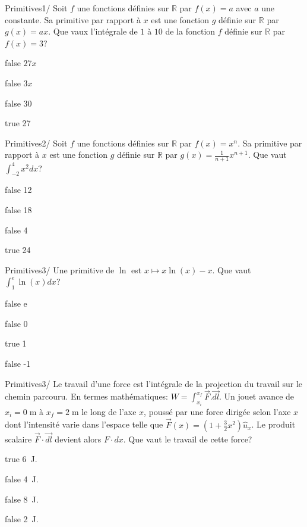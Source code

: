         	\begin{question}{60}{Primitives}{1}{/}
				Soit $f$ une fonctions définies sur $\mathbb{R}$ par $f(x)=a$ avec $a$ une constante. Sa primitive par rapport à $x$ est une fonction $g$ définie sur $\mathbb{R}$ par $g(x)=ax$. Que vaux l'intégrale de $1$ à $10$ de la fonction $f$ définie sur $\mathbb{R}$ par $f(x)=3$?
            \end{question}
            \begin{reponses}
            	\item[false] $27x$
            	\item[false] $3x$
                \item[false] 30
                \item[true] 27
            \end{reponses}
            \begin{question}{60}{Primitives}{2}{/}
                Soit $f$ une fonctions définies sur $\mathbb{R}$ par $f(x)=x^n$. Sa primitive par rapport à $x$ est une fonction $g$ définie sur $\mathbb{R}$ par $g(x)=\frac{1}{n+1}x^{n+1}$. Que vaut $\int_{-2}^4 x^2 dx$?
            \end{question}
            \begin{reponses}
                \item[false] 12
                \item[false] 18
                \item[false] 4
                \item[true] 24
            \end{reponses}
        	\begin{question}{60}{Primitives}{3}{/}
				Une primitive de $\ln$ est $x\mapsto x\ln(x)-x$. Que vaut $\int_{1}^e \ln(x)dx$?
            \end{question}
            \begin{reponses}
            	\item[false] e
            	\item[false] 0
                \item[true] 1
                \item[false] -1
            \end{reponses}
            \begin{question}{60}{Primitives}{3}{/}
                Le travail d'une force est l'intégrale de la projection du travail sur le chemin parcouru. En termes mathématiques: $W=\int_{x_i}^{x_f}\vec{F}.\vec{dl}$. Un jouet avance de $x_i=0\;\si{\meter}$ à $x_f=2\;\si{\meter}$ le long de l'axe $x$, poussé par une force dirigée selon l'axe $x$ dont l'intensité varie dans l'espace telle que $\vec{F}(x) = (1+\frac{3}{2}x^2)\hat{u}_x$. Le produit scalaire $\vec{F}\cdot\vec{dl}$ devient alors $F\cdot dx$.
                Que vaut le travail de cette force?
            \end{question}
            \begin{reponses}
                \item[true] \SI{6}{J}.
                \item[false] \SI{4}{J}.
                \item[false] \SI{8}{J}.
                \item[false] \SI{2}{J}.
            \end{reponses}
